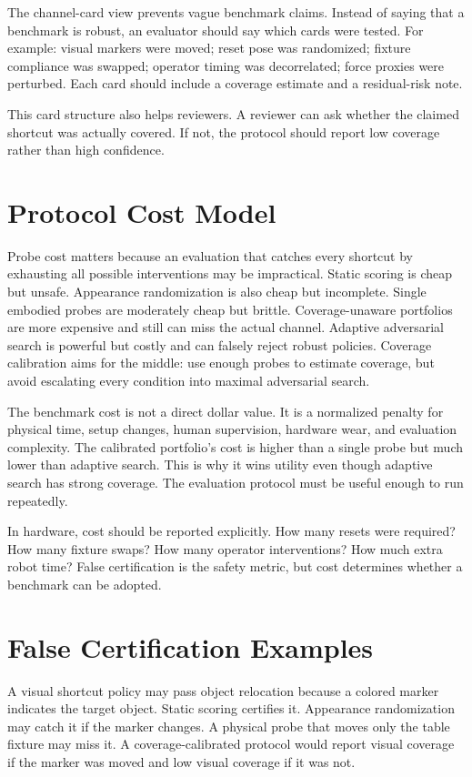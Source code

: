 \documentclass{article}
\begin{document}
The channel-card view prevents vague benchmark claims. Instead of saying that a benchmark is robust, an evaluator should say which cards were tested. For example: visual markers were moved; reset pose was randomized; fixture compliance was swapped; operator timing was decorrelated; force proxies were perturbed. Each card should include a coverage estimate and a residual-risk note.

This card structure also helps reviewers. A reviewer can ask whether the claimed shortcut was actually covered. If not, the protocol should report low coverage rather than high confidence.

\clearpage
\section{Protocol Cost Model}

Probe cost matters because an evaluation that catches every shortcut by exhausting all possible interventions may be impractical. Static scoring is cheap but unsafe. Appearance randomization is also cheap but incomplete. Single embodied probes are moderately cheap but brittle. Coverage-unaware portfolios are more expensive and still can miss the actual channel. Adaptive adversarial search is powerful but costly and can falsely reject robust policies. Coverage calibration aims for the middle: use enough probes to estimate coverage, but avoid escalating every condition into maximal adversarial search.

The benchmark cost is not a direct dollar value. It is a normalized penalty for physical time, setup changes, human supervision, hardware wear, and evaluation complexity. The calibrated portfolio's cost is higher than a single probe but much lower than adaptive search. This is why it wins utility even though adaptive search has strong coverage. The evaluation protocol must be useful enough to run repeatedly.

In hardware, cost should be reported explicitly. How many resets were required? How many fixture swaps? How many operator interventions? How much extra robot time? False certification is the safety metric, but cost determines whether a benchmark can be adopted.

\clearpage
\section{False Certification Examples}

A visual shortcut policy may pass object relocation because a colored marker indicates the target object. Static scoring certifies it. Appearance randomization may catch it if the marker changes. A physical probe that moves only the table fixture may miss it. A coverage-calibrated protocol would report visual coverage if the marker was moved and low visual coverage if it was not.
\end{document}
